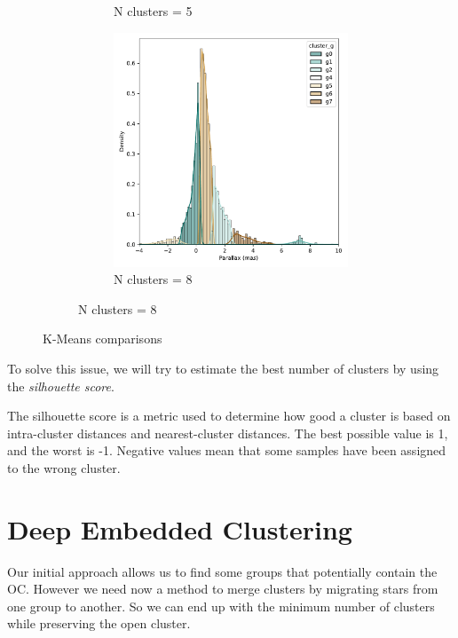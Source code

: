 \documentclass[11pt, a4paper, english]{book}
\begin{document}
\begin{figure}[htbp]
\begin{subfigure}{0.9\textwidth}
\begin{subfigure}[t]{0.3\textwidth}
      \caption{N clusters = 5}
    \end{subfigure}
    \hfill
    \begin{subfigure}[t]{0.3\textwidth}
      \centering
      \includegraphics[width=\textwidth]{../figures/kmeans_n8_parallax_melotte_22.pdf}
      \caption{N clusters = 8}
    \end{subfigure}
  \end{subfigure}
  \caption{K-Means comparisons}
  \label{fig:kmeans_comparisons_melotte_22}
\end{figure}

To solve this issue, we will try to estimate the best number of clusters by using the \emph{silhouette score}.

The silhouette score is a metric used to determine how good a cluster is based on intra-cluster distances and nearest-cluster distances.
The best possible value is 1, and the worst is -1. Negative values mean that some samples have been assigned to the wrong cluster.

\section{Deep Embedded Clustering}

Our initial approach allows us to find some groups that potentially contain the OC. However we need now a method to merge clusters
by migrating stars from one group to another. So we can end up with the minimum number of clusters while preserving the open cluster.
\end{document}
